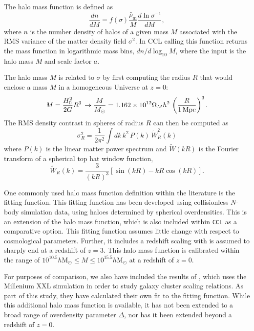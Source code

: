 \documentclass[\docopts]{\docclass}
\newcommand{\ccl}{{\tt CCL}\xspace}
\begin{document}
The halo mass function is defined as
\begin{equation}
\frac{dn}{dM}=f(\sigma)\frac{\bar{\rho}_\mathrm{m}}{M}\frac{d\ln{\sigma^{-1}}}{dM},
\label{eq:halo_mass_function}
\end{equation}
where $n$ is the number density of halos of a given mass $M$ associated with the RMS variance of the matter density field $\sigma^2$.
In CCL calling this function returns the mass function in logarithmic mass bins, $dn/d\log_{10}{M}$, where the input is the halo mass $M$ and scale factor $a$.

The halo mass $M$ is related to $\sigma$ by first computing the radius $R$ that would enclose a mass $M$ in a homogeneous Universe at $z=0$:
\begin{equation}
  M=\frac{H_0^2}{2G}R^3\,\rightarrow \frac{M}{M_\odot}=1.162\times10^{12}\Omega_Mh^2\,\left(\frac{R}{1\,{\rm Mpc}}\right)^3.
\end{equation}
The RMS density contrast in spheres of radius $R$ can then be computed as
\begin{equation}
  \sigma_R^2 = \frac{1}{2\pi^2}\int dk\,k^2\,P(k)\,\tilde{W}_R^2(k)
  \label{eq:sigR}
\end{equation}
where $P(k)$ is the linear matter power spectrum and $\tilde{W}(kR)$ is the Fourier transform of a spherical top hat window function,
\begin{equation}
\tilde{W}_R(k) = \frac{3}{(kR)^3}[\sin(kR)-kR\cos(kR)].
\end{equation}

One commonly used halo mass function definition within the literature is the \citet{Tinker2010} fitting function. This fitting function has been developed using collisionless $N$-body simulation data, using haloes determined by spherical overdensities. This is an extension of the \citet{Tinker2008} halo mass function, which is also included within \ccl as a comparative option. This fitting function assumes little change with respect to cosmological parameters. Further, it includes a redshift scaling with is assumed to sharply end at a redshift of $z = 3$. This halo mass function is calibrated within the range of $10^{10.5} h\mathrm{M}_\odot \leq M \leq 10^{15.5} h\mathrm{M}_\odot$ at a redshift of $z = 0$.

For purposes of comparison, we also have included the results of \citet{Angulo2012}, which uses the Millenium XXL simulation in order to study galaxy cluster scaling relations. As part of this study, they have calculated their own fit to the \citet{Tinker2010} fitting function. While this additional halo mass function is available, it has not been extended to a broad range of overdensity parameter $\Delta$, nor has it been extended beyond a redshift of $z = 0$.
\end{document}
